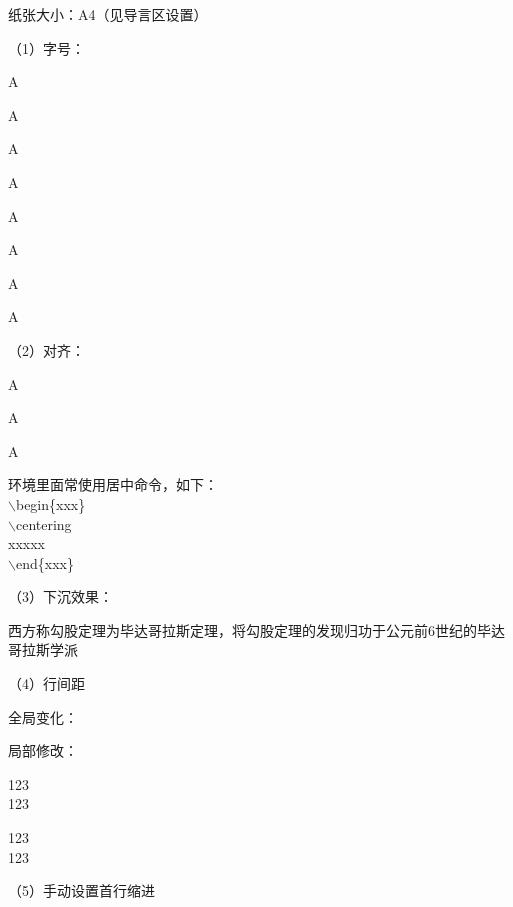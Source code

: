 \documentclass[a4paper]{article}
\renewcommand{\baselinestretch}{2.0}
\begin{document}
纸张大小：A4（见导言区设置）

（1）字号：

{\tiny A}  %

{\scriptsize A}  %

{\small A}  %

{\normalsize A}  %

{\large A}  %

{\Large A}  %

{\LARGE A}  %

{\huge A}  %

（2）对齐：

\begin{flushleft}  %
    A
\end{flushleft}

\begin{center}  %
    A
\end{center}

\begin{flushright}  %
    A
\end{flushright}

环境里面常使用居中命令，如下：\\
$\backslash$begin\{xxx\}\\
$\backslash$centering\\
xxxxx\\
$\backslash$end\{xxx\}


（3）下沉效果： %

\lettrine{西}方称勾股定理为毕达哥拉斯定理，将勾股定理的发现归功于公元前6世纪的毕达哥拉斯学派

（4）行间距

全局变化： %

局部修改：

123\\
123

123 \vspace{2cm} \\
123

（5）手动设置首行缩进 %



\hspace{2em}{123} %
\end{document}
